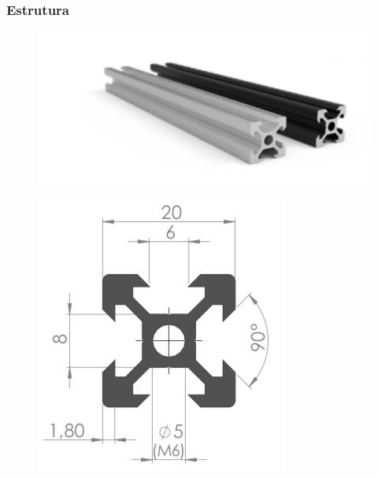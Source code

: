 \begin{frame}
\frametitle{Estrutura}

\begin{figure}
\centering
\includegraphics[scale = 0.25]{figs/p20x20p}
\end{figure}

\begin{figure}
\centering
\includegraphics[scale = 0.45]{figs/p20x20d}
\end{figure}
    
\end{frame}

